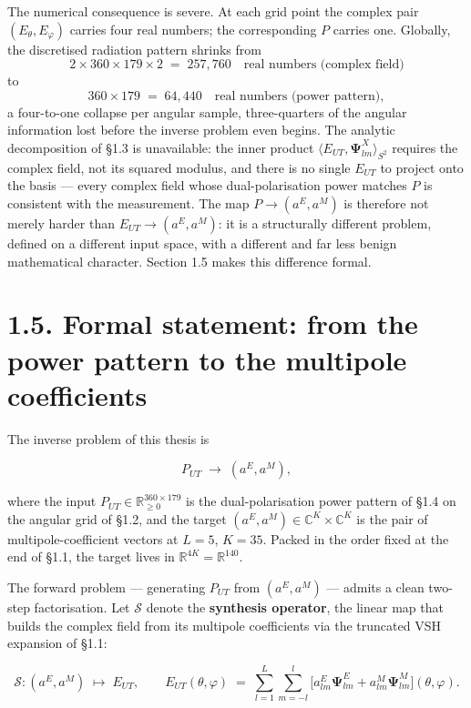 \documentclass[
  english,
  11pt,
]{report}
\begin{document}
The numerical consequence is severe. At each grid point the complex pair
\((E_\theta, E_\varphi)\) carries four real numbers; the corresponding
\(P\) carries one. Globally, the discretised radiation pattern shrinks
from \[
2 \times 360\times 179\times 2 \;=\; 257{,}760 \quad\text{real numbers (complex field)}
\] to \[
360\times 179 \;=\; 64{,}440 \quad\text{real numbers (power pattern)},
\] a four-to-one collapse per angular sample, three-quarters of the
angular information lost before the inverse problem even begins. The
analytic decomposition of §1.3 is unavailable: the inner product
\(\langle E_{UT}, \boldsymbol{\Psi}^X_{lm}\rangle_{S^2}\) requires the
complex field, not its squared modulus, and there is no single
\(E_{UT}\) to project onto the basis --- every complex field whose
dual-polarisation power matches \(P\) is consistent with the
measurement. The map \(P \to (a^E, a^M)\) is therefore not merely harder
than \(E_{UT} \to (a^E, a^M)\): it is a structurally different problem,
defined on a different input space, with a different and far less benign
mathematical character. Section 1.5 makes this difference formal.

\section{1.5. Formal statement: from the power pattern to the multipole
coefficients}\label{formal-statement-from-the-power-pattern-to-the-multipole-coefficients}

The inverse problem of this thesis is

\[
P_{UT} \;\longrightarrow\; (a^E, a^M),
\]

where the input \(P_{UT}\in\mathbb{R}_{\ge 0}^{360\times 179}\) is the
dual-polarisation power pattern of §1.4 on the angular grid of §1.2, and
the target \((a^E, a^M)\in\mathbb{C}^{K}\times\mathbb{C}^{K}\) is the
pair of multipole-coefficient vectors at \(L=5\), \(K=35\). Packed in
the order fixed at the end of §1.1, the target lives in
\(\mathbb{R}^{4K}=\mathbb{R}^{140}\).

The forward problem --- generating \(P_{UT}\) from \((a^E, a^M)\) ---
admits a clean two-step factorisation. Let \(\mathcal{S}\) denote the
\textbf{synthesis operator}, the linear map that builds the complex
field from its multipole coefficients via the truncated VSH expansion of
§1.1:

\[
\mathcal{S}: (a^E, a^M)\;\longmapsto\; E_{UT}, \qquad
E_{UT}(\theta,\varphi) \;=\; \sum_{l=1}^{L}\sum_{m=-l}^{l}\bigl[a^E_{lm}\boldsymbol{\Psi}^E_{lm} + a^M_{lm}\boldsymbol{\Psi}^M_{lm}\bigr](\theta,\varphi).
\]
\end{document}
